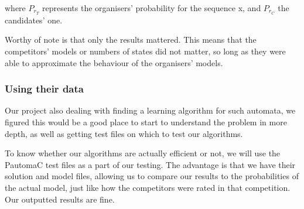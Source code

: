 where $P_{r_{T}}$ represents the organisers' probability for the
sequence x, and $P_{r_{C}}$ the candidates' one.

Worthy of note is that only the results mattered. This means that
the competitors\textquoteright{} models or numbers of states did not
matter, so long as they were able to approximate the behaviour of
the organisers\textquoteright{} models.


\subsubsection{Using their data}

Our project also dealing with finding a learning algorithm for such
automata, we figured this would be a good place to start to understand
the problem in more depth, as well as getting test files on which
to test our algorithms.

To know whether our algorithms are actually efficient or not, we will
use the PautomaC test files as a part of our testing. The advantage
is that we have their solution and model files, allowing us to compare
our results to the probabilities of the actual model, just like how
the competitors were rated in that competition. Our outputted results
are fine.